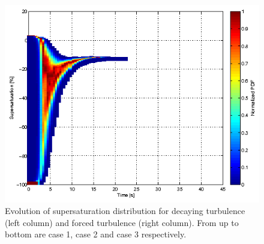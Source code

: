 \documentclass[draft,jgrga]{AGUTeX}
\begin{document}
\begin{article}
\begin{figure}[!htbp]
\includegraphics[width=0.48\linewidth]{Figures/pdf_supersat_f3}
\caption{Evolution of supersaturation distribution for decaying turbulence (left column) 
and forced turbulence (right column). From up to bottom are case 1, case 2 and case 3 respectively.}\label{fig:supersat_distri}
\end{figure}


\end{article}
\end{document}
